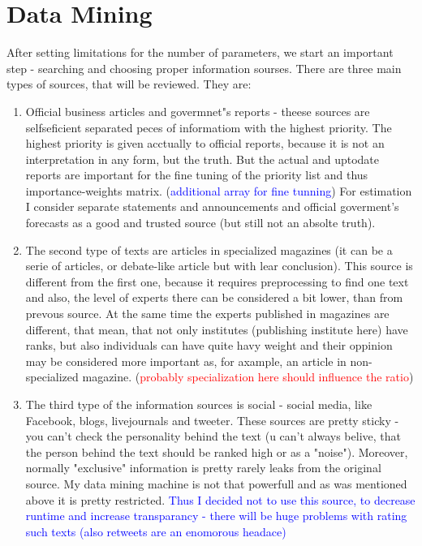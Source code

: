 \documentclass[11pt]{article}
\begin{document}
\section{Data Mining}
After setting limitations for the number of parameters, we start an important step - searching and choosing proper information sourses. 
There are three main types of sources, that will be
reviewed. They are: \\
\begin{enumerate}
	\item Official business articles and govermnet"s reports - theese sources are selfseficient separated peces of informatiom with the highest priority. The highest priority is given acctually to official reports, because it is not an interpretation in any form, but the truth. But the actual and uptodate reports are important for the fine tuning of the priority list and thus importance-weights matrix. (\textcolor{blue}{additional array for fine tunning}) For estimation I consider separate statements and announcements and official goverment's forecasts as a good and trusted source (but still not an absolte truth).\\
	 \item The second type of texts are articles in specialized magazines (it can be a serie of articles, or debate-like article but with lear conclusion). This source is different from the first one, because it requires preprocessing to find one text and also, the level of experts there can be considered a bit lower, than from prevous source. At the same time the experts published in magazines are different, that mean, that not only institutes (publishing institute here) have ranks, but also individuals can have quite havy weight and their oppinion may be considered more important as, for axample, an article in non-specialized magazine. (\textcolor{red}{probably specialization here should influence the ratio})
	 \item The third type of the information sources is social - social media, like Facebook, blogs, livejournals and tweeter. These sources are pretty sticky - you can't check the personality behind the text (u can't always belive, that the person behind the text should be ranked high or as a "noise"). Moreover, normally "exclusive" information is pretty rarely leaks from the original source. My data mining machine is not that powerfull and as was mentioned above it is pretty restricted. 
\textcolor{blue}{Thus I decided not to use this source, to decrease runtime and increase transparancy - there will be huge problems with rating such texts (also retweets are an enomorous headace)}	
\end{enumerate}
\end{document}
